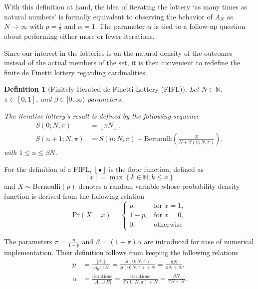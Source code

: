\documentclass{article}
\newtheorem{definition}{Definition}
\newcommand{\N}{\mathbb{N}}
\newcommand{\card}[1]{\left| #1 \right|}
\newcommand{\sset}[1]{\left\{ #1 \right\}}
\newcommand{\ppar}[1]{\left( #1 \right)}
\newcommand{\floor}[1]{\left\lfloor #1 \right\rfloor}
\begin{document}
With this definition at hand, the idea of iterating the lottery `as many times as natural numbers' is formally equivalent to observing the behavior of $A_{N}$ as $N \rightarrow \infty$ with $p=\frac{1}{2}$ and $\alpha=1$.
%
The parameter $\alpha$ is tied to a follow-up question about performing either more or fewer iterations.


Since our interest in the lotteries is on the natural density of the outcomes instead of the actual members of the set, it is then convenient to redefine the finite de Finetti lottery regarding cardinalities.

\begin{definition}[Finitely-Iterated de Finetti Lottery (FIFL)]
Let $N\in \N$, $\pi \in [0,1]$, and $\beta \in [0, \infty)$ parameters.

The iterative lottery's result is defined by the following sequence
\begin{align}
    S\ppar{0; N, \pi} &= \floor{\pi N}, \\
    S\ppar{n+1; N, \pi} &= S\ppar{n; N, \pi} - \text{Bernoulli}\ppar{\frac{N}{N+S\ppar{n; N, \pi}}},
\end{align}
with $1\leq n\leq \beta N$.
\end{definition}

For the definition of a FIFL, $\floor{\bullet}$ is the floor function, defined as
\begin{equation}
    \floor{x} = \max\sset{k\in \N; k \leq x}
\end{equation}
and $X\sim $Bernoulli$\ppar{p}$ denotes a random variable whose probability density function is derived from the following relation
\begin{equation}
    \text{Pr}\ppar{X=x} = \begin{cases}
        p, &\text{for } x=1,\\
        1-p, &\text{for } x=0, \\
        0, &\text{otherwise}
    \end{cases}
\end{equation}

The parameters $\pi = \frac{p}{1-p}$ and $\beta = \ppar{1+\pi} \alpha$ are introduced for ease of numerical implementation. 
%
Their definition follows from keeping the following relations
\begin{align}
    p &=
    \frac{\card{A_0}}{\card{A_0 \cup B}} = \frac{S\ppar{0; N, \pi}}{S\ppar{0; N, \pi}+N}
    = \frac{\pi N}{\pi N + N},
    \\
    \alpha &=
    \frac{\text{iterations}}{\card{A_0 \cup B}} =
    \frac{\text{iterations}}{S\ppar{0; N, \pi}+N}
    = \frac{\beta N}{\pi N + N}.
\end{align}
\end{document}
